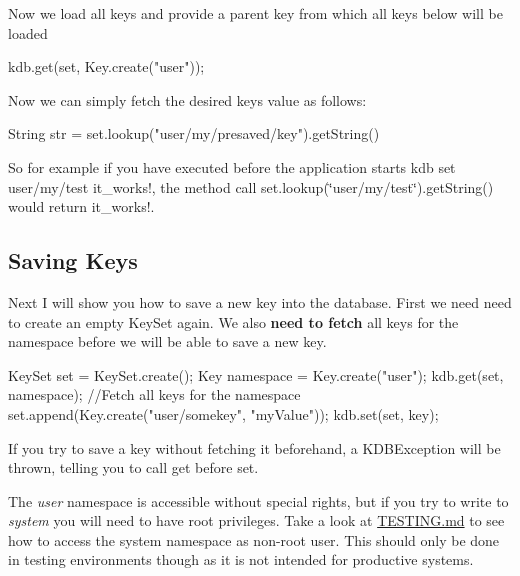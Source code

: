 Now we load all keys and provide a parent key from which all keys below will be loaded


\begin{DoxyCode}
kdb.get(\textcolor{keyword}{set}, Key.create(\textcolor{stringliteral}{"user"}));
\end{DoxyCode}


Now we can simply fetch the desired key\textquotesingle{}s value as follows\+:


\begin{DoxyCode}
String str = \textcolor{keyword}{set}.lookup(\textcolor{stringliteral}{"user/my/presaved/key"}).getString()
\end{DoxyCode}


So for example if you have executed before the application starts {\ttfamily kdb set user/my/test it\+\_\+works!}, the method call {\ttfamily set.\+lookup(\char`\"{}user/my/test\char`\"{}).get\+String()} would return {\ttfamily it\+\_\+works!}.

\subsection*{Saving Keys}

Next I will show you how to save a new key into the database. First we need need to create an empty {\ttfamily Key\+Set} again. We also {\bfseries need to fetch} all keys for the namespace before we will be able to save a new key.


\begin{DoxyCode}
KeySet \textcolor{keyword}{set} = KeySet.create();
Key \textcolor{keyword}{namespace }= Key.create("user");
kdb.get(\textcolor{keyword}{set}, \textcolor{keyword}{namespace});    \textcolor{comment}{//Fetch all keys for the namespace}
\textcolor{keyword}{set}.append(Key.create(\textcolor{stringliteral}{"user/somekey"}, \textcolor{stringliteral}{"myValue"}));
kdb.set(\textcolor{keyword}{set}, key);
\end{DoxyCode}


If you try to save a key without fetching it beforehand, a {\ttfamily K\+D\+B\+Exception} will be thrown, telling you to call get before set.

The {\itshape user} namespace is accessible without special rights, but if you try to write to {\itshape system} you will need to have root privileges. Take a look at \hyperlink{doc_TESTING_md}{T\+E\+S\+T\+I\+NG.md} to see how to access the system namespace as non-\/root user. This should only be done in testing environments though as it is not intended for productive systems.

